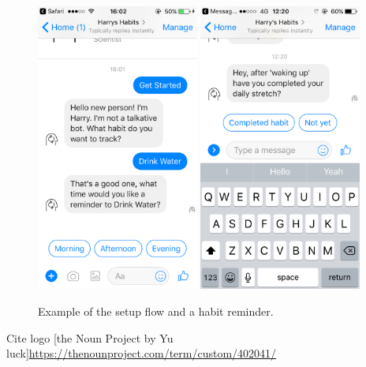 \begin{figure}[H]
  \centering
  \includegraphics[width=2.1in]{../resources/design/media/5.png}
  \hspace{10px}
  \includegraphics[width=2.1in]{../resources/design/media/3.png}
  \caption{Example of the setup flow and a habit reminder.}
  \label{fig:setup_media_2}
\end{figure}

Cite logo [the Noun Project by Yu luck]\url{https://thenounproject.com/term/custom/402041/}

\newpage
